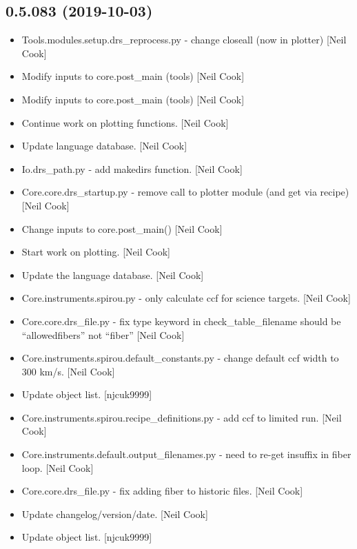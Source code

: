\documentclass[a4paper,10pt,english]{report}
\begin{document}
\subsection{0.5.083 (2019-10-03)}
\label{\detokenize{misc/changelog:id58}}\begin{itemize}
\item {} 
Tools.modules.setup.drs\_reprocess.py - change closeall (now in
plotter) {[}Neil Cook{]}

\item {} 
Modify inputs to core.post\_main (tools) {[}Neil Cook{]}

\item {} 
Modify inputs to core.post\_main (tools) {[}Neil Cook{]}

\item {} 
Continue work on plotting functions. {[}Neil Cook{]}

\item {} 
Update language database. {[}Neil Cook{]}

\item {} 
Io.drs\_path.py - add makedirs function. {[}Neil Cook{]}

\item {} 
Core.core.drs\_startup.py - remove call to plotter module (and get via
recipe) {[}Neil Cook{]}

\item {} 
Change inputs to core.post\_main() {[}Neil Cook{]}

\item {} 
Start work on plotting. {[}Neil Cook{]}

\item {} 
Update the language database. {[}Neil Cook{]}

\item {} 
Core.instruments.spirou.py - only calculate ccf for science targets.
{[}Neil Cook{]}

\item {} 
Core.core.drs\_file.py - fix type keyword in check\_table\_filename
should be “allowedfibers” not “fiber” {[}Neil Cook{]}

\item {} 
Core.instruments.spirou.default\_constants.py - change default ccf
width to 300 km/s. {[}Neil Cook{]}

\item {} 
Update object list. {[}njcuk9999{]}

\item {} 
Core.instruments.spirou.recipe\_definitions.py - add ccf to limited
run. {[}Neil Cook{]}

\item {} 
Core.instruments.default.output\_filenames.py - need to re-get insuffix
in fiber loop. {[}Neil Cook{]}

\item {} 
Core.core.drs\_file.py - fix adding fiber to historic files. {[}Neil
Cook{]}

\item {} 
Update changelog/version/date. {[}Neil Cook{]}

\item {} 
Update object list. {[}njcuk9999{]}

\end{itemize}
\end{document}
